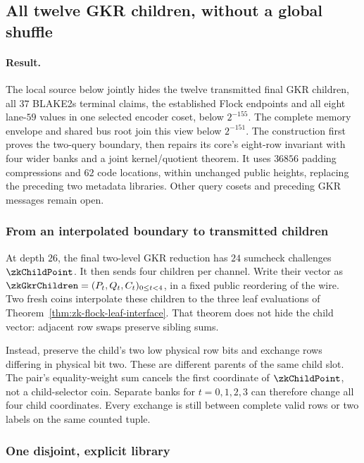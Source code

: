 \subsection{All twelve GKR children, without a global shuffle}\label{note:zk-flock-children}

\paragraph{Result.} The local source below jointly hides the twelve transmitted final GKR children, all $37$ BLAKE2s terminal claims, the established Flock endpoints and all eight lane-$59$ values in one selected encoder coset, below $2^{-155}$. The complete memory envelope and shared bus root join this view below $2^{-151}$. The construction first proves the two-query boundary, then repairs its core's eight-row invariant with four wider banks and a joint kernel/quotient theorem. It uses $36856$ padding compressions and $62$ code locations, within unchanged public heights, replacing the preceding two metadata libraries. Other query cosets and preceding GKR messages remain open.

\subsubsection{From an interpolated boundary to transmitted children}

At depth $26$, the final two-level GKR reduction has $24$ sumcheck challenges $\zkChildPoint$. It then sends four children per channel. Write their vector as $\zkGkrChildren=(P_t,Q_t,C_t)_{0\le t<4}$, in a fixed public reordering of the wire. Two fresh coins interpolate these children to the three leaf evaluations of Theorem~\ref{thm:zk-flock-leaf-interface}. That theorem does not hide the child vector: adjacent row swaps preserve sibling sums.

Instead, preserve the child's two low physical row bits and exchange rows differing in physical bit two. These are different parents of the same child slot. The pair's equality-weight sum cancels the first coordinate of $\zkChildPoint$, not a child-selector coin. Separate banks for $t=0,1,2,3$ can therefore change all four child coordinates. Every exchange is still between complete valid rows or two labels on the same counted tuple.

\subsubsection{One disjoint, explicit library}

